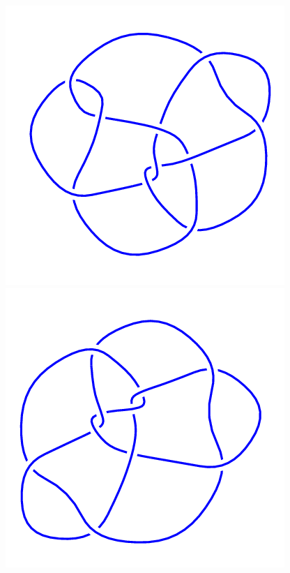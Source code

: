 \begin{figure}[H]
	\begin{minipage}[b]{.18\linewidth}
		\centering
		\includegraphics[width=\linewidth]{../data/10_97.png}
	\end{minipage}
	\begin{minipage}[b]{.18\linewidth}
		\centering
		\includegraphics[width=\linewidth]{../data/10_98.png}

\end{minipage}
\end{figure}
